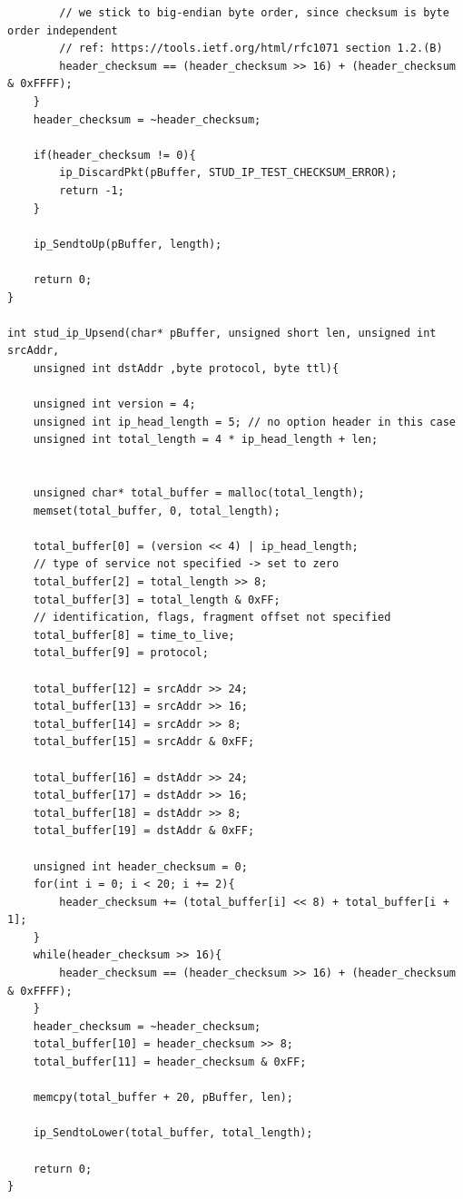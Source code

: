 \documentclass{article}
\begin{document}
\begin{lstlisting}
        // we stick to big-endian byte order, since checksum is byte order independent
        // ref: https://tools.ietf.org/html/rfc1071 section 1.2.(B)
        header_checksum == (header_checksum >> 16) + (header_checksum & 0xFFFF);
    }
    header_checksum = ~header_checksum;

    if(header_checksum != 0){
        ip_DiscardPkt(pBuffer, STUD_IP_TEST_CHECKSUM_ERROR);
        return -1;
    }

    ip_SendtoUp(pBuffer, length);

    return 0;
}

int stud_ip_Upsend(char* pBuffer, unsigned short len, unsigned int srcAddr,
    unsigned int dstAddr ,byte protocol, byte ttl){

    unsigned int version = 4;
    unsigned int ip_head_length = 5; // no option header in this case
    unsigned int total_length = 4 * ip_head_length + len;


    unsigned char* total_buffer = malloc(total_length);
    memset(total_buffer, 0, total_length);

    total_buffer[0] = (version << 4) | ip_head_length;
    // type of service not specified -> set to zero
    total_buffer[2] = total_length >> 8;
    total_buffer[3] = total_length & 0xFF;
    // identification, flags, fragment offset not specified
    total_buffer[8] = time_to_live;
    total_buffer[9] = protocol;

    total_buffer[12] = srcAddr >> 24;
    total_buffer[13] = srcAddr >> 16;
    total_buffer[14] = srcAddr >> 8;
    total_buffer[15] = srcAddr & 0xFF;

    total_buffer[16] = dstAddr >> 24;
    total_buffer[17] = dstAddr >> 16;
    total_buffer[18] = dstAddr >> 8;
    total_buffer[19] = dstAddr & 0xFF;

    unsigned int header_checksum = 0;
    for(int i = 0; i < 20; i += 2){
        header_checksum += (total_buffer[i] << 8) + total_buffer[i + 1];
    }
    while(header_checksum >> 16){
        header_checksum == (header_checksum >> 16) + (header_checksum & 0xFFFF);
    }
    header_checksum = ~header_checksum;
    total_buffer[10] = header_checksum >> 8;
    total_buffer[11] = header_checksum & 0xFF;

    memcpy(total_buffer + 20, pBuffer, len);

    ip_SendtoLower(total_buffer, total_length);

    return 0;
}

\end{lstlisting}
\end{document}

